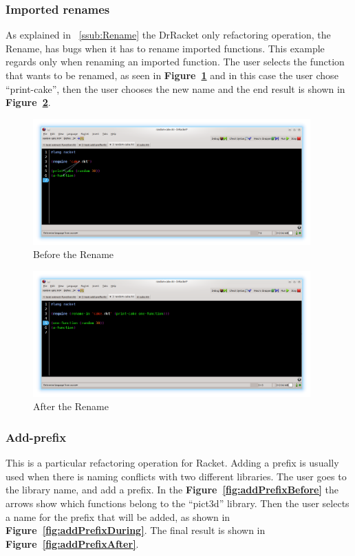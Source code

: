 \subsubsection{Imported renames}
As explained in ~\ref{ssub:Rename} the DrRacket only refactoring operation, the Rename, has bugs when it has to rename imported functions.
This example regards only when renaming an imported function. 
The user selects the function that wants to be renamed, as seen in {\bf Figure~\ref{fig:renameBefore}} and in this case the user chose ``print-cake'', then the user chooses the new name and the end result is shown in {\bf Figure~\ref{fig:renameAfter}}.
\begin{figure}[htbp]
	\centering
	\includegraphics[width=0.95\textwidth]{img/rename1.png}
	\caption{Before the Rename}
	\label{fig:renameBefore}
\end{figure}

\begin{figure}[htbp]
	\centering
	\includegraphics[width=0.95\textwidth]{img/rename2.png}
	\caption{After the Rename}
	\label{fig:renameAfter}
\end{figure}

\subsubsection{Add-prefix}

This is a particular refactoring operation for Racket. Adding a prefix is usually used when there is naming conflicts with two different libraries. The user goes to the library name, and add a prefix.
In the {\bf Figure~\ref{fig:addPrefixBefore}} the arrows show which functions belong to the ``pict3d'' library.
Then the user selects a name for the prefix that will be added, as shown in {\bf Figure~\ref{fig:addPrefixDuring}}. The final result is shown in {\bf Figure~\ref{fig:addPrefixAfter}}.

